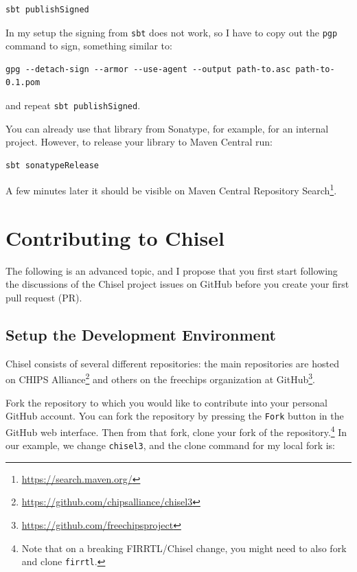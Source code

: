 \documentclass[%
    10pt,
    headinclude, footexclude,
    openright, %
    notitlepage,
    cleardoubleempty,
    headsepline,
    pointlessnumbers,
    bibtotoc, idxtotoc,
    ]{scrbook}
\newcommand{\code}[1]{{\small{\texttt{#1}}}}
\newcommand{\myref}[2]{\href{#1}{#2}}
\renewcommand{\myref}[2]{{#2}{\footnote{\url{#1}}}}
\begin{document}
\begin{verbatim}
sbt publishSigned
\end{verbatim}

In my setup the signing from \code{sbt} does not work, so I have to copy
out the \code{pgp} command to sign, something similar to:

\begin{verbatim}
gpg --detach-sign --armor --use-agent --output path-to.asc path-to-0.1.pom
\end{verbatim}

\noindent and repeat \code{sbt publishSigned}.

You can already use that library from Sonatype, for example, for an internal project.
However, to release your library to Maven Central run:

\begin{verbatim}
sbt sonatypeRelease
\end{verbatim}

A few minutes later it should be visible on \myref{https://search.maven.org/}{Maven Central
Repository Search}.

\section{Contributing to Chisel}

The following is an advanced topic, and I propose that you first start following the discussions
of the Chisel project issues on GitHub before you create your first pull request (PR).

\subsection{Setup the Development Environment}

Chisel consists of several different repositories: the main repositories are hosted on
\myref{https://github.com/chipsalliance/chisel3}{CHIPS Alliance} and others on
the \myref{https://github.com/freechipsproject}{freechips organization at GitHub}.

Fork the repository to which you would like to contribute into your personal GitHub account.
You can fork the repository by pressing the \code{Fork} button in the GitHub web interface.
Then from that fork, clone your fork of the repository.\footnote{Note that on a breaking
FIRRTL/Chisel change, you might need to also fork and clone \code{firrtl}.}
In our example, we change \code{chisel3}, and the clone command for my local fork is:
\end{document}
